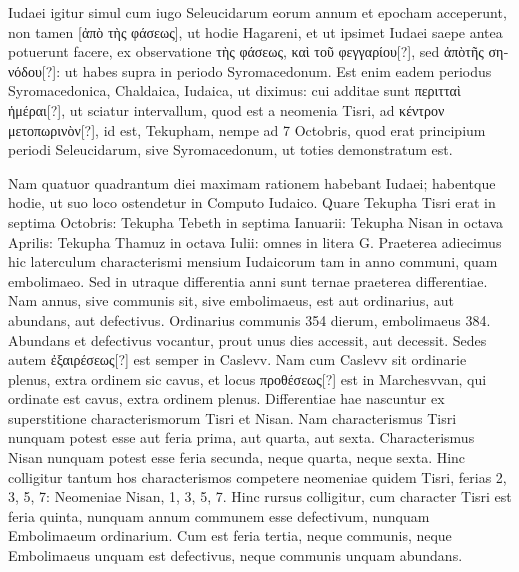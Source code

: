 Iudaei igitur simul cum iugo
 Seleucidarum eorum annum et epocham
acceperunt, non tamen \textgreek{[ἀπὸ τὴς φάσεως]},
 ut hodie Hagareni, et ut ipsimet
Iudaei saepe antea potuerunt facere, ex observatione
 \textgreek{τὴς φάσεως, καὶ τοῦ φεγγαρίου[?]},
sed \textgreek{ἀπὸτῆς σηνόδου[?]}: ut habes supra in periodo Syromacedonum.
Est enim eadem periodus Syromacedonica, Chaldaica, Iudaica, ut diximus:
cui additae sunt \textgreek{περιτταὶ ἡμέραι[?]}, ut sciatur intervallum, quod est
a neomenia Tisri, ad \textgreek{κέντρον μετοπωρινὸν[?]},
 id est, Tekupham, nempe ad 7
Octobris, quod erat principium periodi Seleucidarum, sive Syromacedonum,
ut toties demonstratum
est.

\begin{table}[htbp]
  \centering
  
\end{table}

Nam quatuor quadrantum
diei maximam rationem
habebant Iudaei; habentque
hodie, ut suo loco ostendetur
in Computo Iudaico.
Quare Tekupha Tisri erat in
septima Octobris: Tekupha
Tebeth in septima Ianuarii:
Tekupha Nisan in octava Aprilis:
Tekupha Thamuz in octava
Iulii: omnes in litera G.
Praeterea adiecimus hic laterculum
characterismi mensium
Iudaicorum tam in anno communi,
quam embolimaeo.
Sed in utraque differentia anni sunt ternae
praeterea differentiae.
Nam annus, sive communis sit, sive embolimaeus,
est aut ordinarius, aut abundans, aut defectivus.
Ordinarius communis
354 dierum, embolimaeus 384.
Abundans et defectivus vocantur,
prout unus dies accessit, aut decessit.
Sedes autem \textgreek{ἐξαιρέσεως[?]} est semper
in Caslevv.
Nam cum Caslevv sit ordinarie plenus, extra ordinem sic
cavus, et locus \textgreek{προθέσεως[?]} est in Marchesvvan,
 qui ordinate est cavus,
extra ordinem plenus.
Differentiae hae nascuntur ex superstitione characterismorum
Tisri et Nisan.
Nam characterismus Tisri nunquam
potest esse aut feria prima, aut quarta, aut sexta.
Characterismus Nisan
nunquam potest esse feria secunda, neque quarta, neque sexta.
Hinc
colligitur tantum hos characterismos competere neomeniae quidem
Tisri, ferias 2, 3, 5, 7: Neomeniae Nisan, 1, 3, 5, 7.
Hinc rursus colligitur,
cum character Tisri est feria quinta, nunquam annum communem
esse defectivum, nunquam Embolimaeum ordinarium.
Cum est feria
tertia, neque communis, neque Embolimaeus unquam est defectivus,
neque communis unquam abundans.

